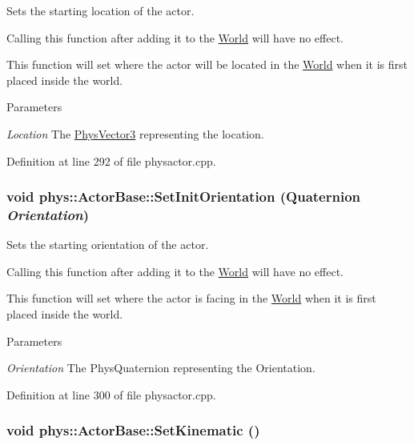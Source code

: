 Sets the starting location of the actor. 

Calling this function after adding it to the \hyperlink{classphys_1_1World}{World} will have no effect. \par
 This function will set where the actor will be located in the \hyperlink{classphys_1_1World}{World} when it is first placed inside the world. 
\begin{DoxyParams}{Parameters}
\item[{\em Location}]The \hyperlink{classPhysVector3}{PhysVector3} representing the location. \end{DoxyParams}


Definition at line 292 of file physactor.cpp.

\hypertarget{classphys_1_1ActorBase_a681186465db767954ca3f9530a1d7c36}{
\subsubsection[{SetInitOrientation}]{\setlength{\rightskip}{0pt plus 5cm}void phys::ActorBase::SetInitOrientation ({\bf Quaternion} {\em Orientation})}}
\label{d8/d0f/classphys_1_1ActorBase_a681186465db767954ca3f9530a1d7c36}


Sets the starting orientation of the actor. 

Calling this function after adding it to the \hyperlink{classphys_1_1World}{World} will have no effect. \par
 This function will set where the actor is facing in the \hyperlink{classphys_1_1World}{World} when it is first placed inside the world. 
\begin{DoxyParams}{Parameters}
\item[{\em Orientation}]The PhysQuaternion representing the Orientation. \end{DoxyParams}


Definition at line 300 of file physactor.cpp.

\hypertarget{classphys_1_1ActorBase_acd5613286ec14fb2a8e5ed5f5003dc5f}{
\subsubsection[{SetKinematic}]{\setlength{\rightskip}{0pt plus 5cm}void phys::ActorBase::SetKinematic ()}}
\label{d8/d0f/classphys_1_1ActorBase_acd5613286ec14fb2a8e5ed5f5003dc5f}



